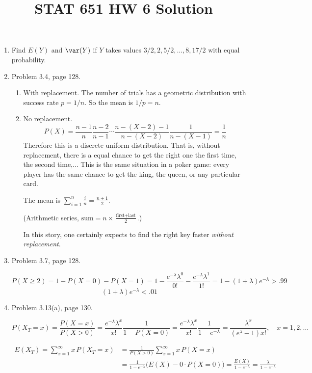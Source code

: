 \documentclass[12pt]{article}
\begin{document}
\title{STAT 651 HW 6 Solution}
\maketitle

\begin{enumerate}
\item Find $E(Y)$ and $\var(Y)$ if $Y$ takes values
$3/2, 2, 5/2,\dotsc, 8, 17/2$ with equal probability.
\item Problem 3.4, page 128.
\begin{enumerate}
\item With replacement. The number of trials has a geometric distribution
with success rate $p = 1/n$. So the mean is $1/p = n$.
\item No replacement.
\[
P(X)
= \frac{n-1}{n} \frac{n-2}{n-1}\dotsm
    \frac{n - (X-2) - 1}{n - (X-2)} \frac{1}{n - (X-1)}
= \frac{1}{n}
\]
Therefore this is a discrete uniform distribution.
That is, without replacement,
there is a equal chance to get the right one the first time, the second
time,... This is the same situation in a poker game: every player has
the same chance to get the king, the queen, or any particular card.

The mean is $\sum_{i=1}^n \frac{i}{n} = \frac{n+1}{2}$.

(Arithmetic series,
$\text{sum} = n \times \frac{\text{first} + \text{last}}{2}$.)

In this story, one certainly expects to find the right key faster
\emph{without replacement}.

\end{enumerate}

\item Problem 3.7, page 128.

\[
P(X \ge 2)
= 1 - P(X = 0) - P(X = 1)
= 1
    - \frac{e^{-\lambda} \lambda^0}{0!}
    - \frac{e^{-\lambda} \lambda^1}{1!}
= 1 - (1+\lambda) e^{-\lambda}
> .99
\]
\[
(1 + \lambda) e^{-\lambda} < .01
\]

\item Problem 3.13(a), page 130.

\[
P(X_T = x)
= \frac{P(X = x)}{P(X > 0)}
= \frac{e^{-\lambda} \lambda^x}{x!}
  \frac{1}{1 - P(X = 0)}
= \frac{e^{-\lambda} \lambda^x}{x!}
    \frac{1}{1 - e^{-\lambda}}
= \frac{\lambda^x}{(e^\lambda - 1) x!}
,\quad
x=1,2,\dotsc
\]

\[\begin{split}
E(X_T)
= \sum_{x=1}^{\infty} x\, P(X_T = x)
&= \frac{1}{P(X > 0)} \sum_{x=1}^{\infty} x\, P(X = x)
\\
&= \frac{1}{1 - e^{-\lambda}}
    \bigl(E(X) - 0\cdot P(X=0)\bigr)
= \frac{E(X)}{1 - e^{-\lambda}}
= \frac{\lambda}{1 - e^{-\lambda}}
\end{split}
\]


\end{enumerate}
\end{document}
